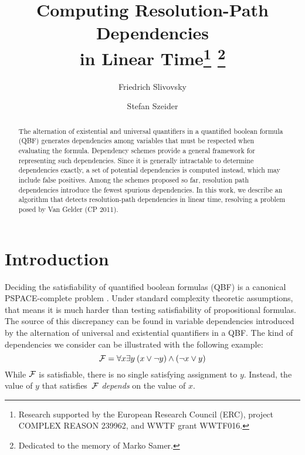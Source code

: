 \documentclass{llncs}
\def\hy{\hbox{-}\nobreak\hskip0pt} \newcommand{\ellipsis}{$\dots$}
\begin{document}
\title{Computing Resolution\hy Path Dependencies\\ in Linear Time\thanks{Research supported by the European Research Council (ERC),
    project COMPLEX REASON 239962, and WWTF grant WWTF016.} \thanks{Dedicated to the memory of Marko Samer.}}

\author{Friedrich Slivovsky \and Stefan Szeider}


\maketitle

\begin{abstract}The alternation of existential and universal quantifiers in
  a quantified boolean formula (QBF) generates dependencies among variables
  that must be respected when evaluating the formula. Dependency schemes
  provide a general framework for representing such dependencies. Since it is
  generally intractable to determine dependencies exactly, a set of potential
  dependencies is computed instead, which may include false positives. Among
  the schemes proposed so far, resolution path dependencies introduce the
  fewest spurious dependencies. In this work, we describe an algorithm that
  detects resolution-path dependencies in linear time, resolving a problem
  posed by Van Gelder (CP 2011).
\end{abstract}

\section{Introduction}
Deciding the satisfiability of quantified boolean formulas (QBF) is a
canonical PSPACE-complete problem \cite{StockmeyerMeyer73}. Under standard
complexity theoretic assumptions, that means it is much harder than testing
satisfiability of propositional formulas. The source of this discrepancy can
be found in variable dependencies introduced by the alternation of universal
and existential quantifiers in a QBF. The kind of dependencies we consider can
be illustrated with the following example:
\[\mathcal{F} = \forall x \exists y\: (x \vee \neg y) \wedge (\neg x \vee y) \] 
While $\mathcal{F}$ is satisfiable, there is no single satisfying assignment to
$y$. Instead, the value of $y$ that satisfies~$\mathcal{F}$ \textit{depends} on the
value of $x$.
\end{document}
